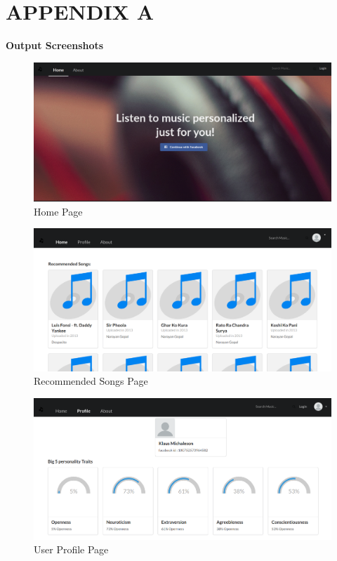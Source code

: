 \newpage
\section*{APPENDIX A}

{\bf Output Screenshots}

\begin{figure}[!ht]
  \centering
    \includegraphics[width=1\textwidth]{fig/home_screenshot.png}
    \caption{Home Page}
\end{figure}

\begin{figure}[!ht]
  \centering
    \includegraphics[width=1\textwidth]{fig/recommended_songs.png}
    \caption{Recommended Songs Page}
\end{figure}

\begin{figure}[!ht]
  \centering
    \includegraphics[width=1\textwidth]{fig/profile_screenshot.png}
    \caption{User Profile Page}
\end{figure}

